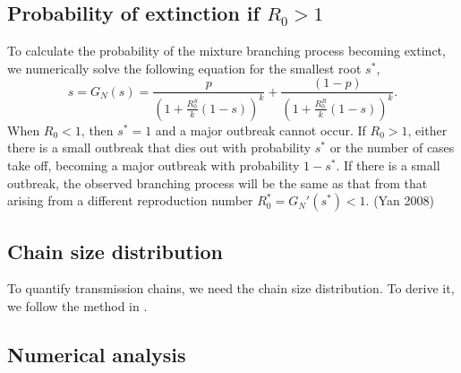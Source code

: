 \documentclass{imammb}
\numberwithin{equation}{section}
\begin{document}
\subsection{Probability of extinction if $R_0>1$}
To calculate the probability of the mixture branching process becoming extinct, we numerically solve the following equation for the smallest root $s^*$, 
\begin{equation}
      s = G_N(s) =  \frac{p}{(1 + \frac{R_0^S}{k}(1-s))^k} +   \frac{(1-p)}{(1 + \frac{R_0^R}{k}(1-s))^k}. 
\end{equation}
When $R_0<1$, then $s^* = 1$ and a major outbreak cannot occur. If $R_0>1$, either there is a small outbreak that dies out with probability $s^*$ or the number of cases take off, becoming a major outbreak with probability $1-s^*$. If there is a small outbreak, the observed branching process will be the same as that from that arising from a different reproduction number $R_0^* = G_N'(s^*)<1$. (Yan 2008) %




\subsection{Chain size distribution}

To quantify transmission chains, we need the chain size distribution. To derive it, we follow the method in \citet{Blumberg2013-xv}. 



\subsection{Numerical analysis} %
\end{document}
